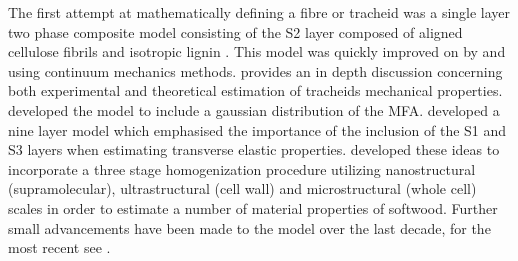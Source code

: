  The first attempt at mathematically defining a fibre or tracheid was a single layer two phase composite model consisting of the S2 layer composed of aligned cellulose fibrils and isotropic lignin \cite{Barber_1964}. This model was quickly improved on by \cite{mark1967cell} and \cite{Cave_1968} using continuum mechanics methods. \cite{mark1967cell} provides an in depth discussion concerning both experimental and theoretical estimation of tracheids mechanical properties. \cite{Cave_1968} developed the model to include a gaussian distribution of the MFA. \cite{bergander2002cell} developed a nine layer model which emphasised the importance of the inclusion of the S1 and S3 layers when estimating transverse elastic properties. \cite{harrington2002hierarchical} developed these ideas to incorporate a three stage homogenization procedure utilizing nanostructural (supramolecular), ultrastructural (cell wall) and microstructural (whole cell) scales in order to estimate a number of material properties of softwood. Further small advancements have been made to the model over the last decade, for the most recent see \cite{Sun_2014}\cite{Saavedra_Flores_2014}\cite{wang2013gradual}\cite{faisal2013multiscale}.
 
 

 
